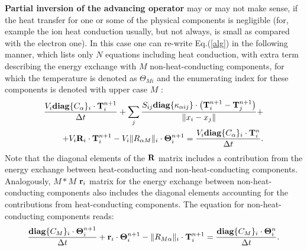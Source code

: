 \documentclass[12pt]{revtex4}
\begin{document}
{\bf Partial inversion of the advancing operator} may or may not make sense, if the heat transfer for one or some of the physical components is negligible (for, example 
the ion heat conduction usually, but not always, is small as compared with the electron one).  In this case one can re-write Eq.(\ref{alg}) in the following manner, which
lists only $N$ equations including heat conduction, with extra term describing the energy exchange with $M$ non-heat-conducting components, for which the
temperature is denoted as $\Theta_{Mi}$ and the enumerating index for these components is denoted with upper case $M$ :
\begin{eqnarray}
\frac{V_i{\bf diag}\{C_\alpha\}_i
\cdot{\bf T}^{n+1}_i}{\Delta t}+\sum_j{\frac{S_{ij}
{\bf diag}\{\kappa_{\alpha ij}\}\cdot
\left({\bf T}^{n+1}_i-{\bf T}^{n+1}_j\right)}{\|x_i-x_j\|}}+\nonumber\\
+V_i{\bf R}_i\cdot {\bf T}^{n+1}_i %
-  V_i\|R_{\alpha M}\|_i\cdot{\bf \Theta}_i^{n+1}
=\frac{V_i{\bf diag}\{C_\alpha\}_i\cdot{\bf T}^{n}_i}{\Delta t}.\label{NM}
\end{eqnarray}
Note that the diagonal elements of the ${\bf R}$ matrix includes a 
contribution from the energy exchange between heat-conducting and non-heat-conducting components. Analogously, 
$M*M$ ${\bf r}_i$ matrix for the
energy exchange between non-heat-conducting components also includes the diagonal elements accounting for the contributions from heat-conducting components. 
The equation  for non-heat-conducting components reads:
\begin{equation}
\frac{{\bf diag}\{C_M\}_i
\cdot{\bf \Theta}^{n+1}_i}{\Delta t}+
{\bf r}_i\cdot {\bf \Theta}^{n+1}_i %
-  \|R_{ M \alpha}\|_i\cdot{\bf T}_i^{n+1}
=\frac{{\bf diag}\{C_M\}_i\cdot{\bf \Theta}^{n}_i}{\Delta t}.\label{MN}
\end{equation}
\end{document}
